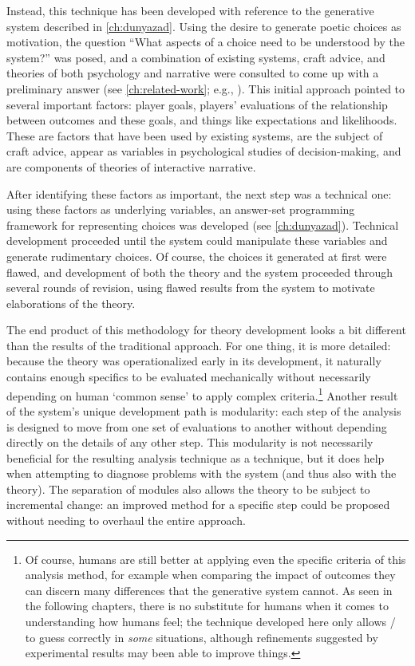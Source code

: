 Instead, this technique has been developed with reference to the generative system described in \cref{ch:dunyazad}.
%
Using the desire to generate poetic choices as motivation, the question ``What aspects of a choice need to be understood by the system?'' was posed, and a combination of existing systems, craft advice, and theories of both psychology and narrative were consulted to come up with a preliminary answer (see \cref{ch:related-work}; e.g., \citep{Mott2006,ChoiceOfGamesChoiceRules,Shepperd2002,WardripFruin2009}).
%
This initial approach pointed to several important factors: player goals, players' evaluations of the relationship between outcomes and these goals, and things like expectations and likelihoods.
%
These are factors that have been used by existing systems, are the subject of craft advice, appear as variables in psychological studies of decision-making, and are components of theories of interactive narrative.


After identifying these factors as important, the next step was a technical one: using these factors as underlying variables, an answer-set programming framework for representing choices was developed (see \cref{ch:dunyazad}).
%
Technical development proceeded until the system could manipulate these variables and generate rudimentary choices.
%
Of course, the choices it generated at first were flawed, and development of both the theory and the system proceeded through several rounds of revision, using flawed results from the system to motivate elaborations of the theory.


The end product of this methodology for theory development looks a bit different than the results of the traditional approach.
%
For one thing, it is more detailed: because the theory was operationalized early in its development, it naturally contains enough specifics to be evaluated mechanically without necessarily depending on human `common sense' to apply complex criteria.\footnote{%
Of course, humans are still better at applying even the specific criteria of this analysis method, for example when comparing the impact of outcomes they can discern many differences that the generative system cannot.
%
As seen in the following chapters, there is no substitute for humans when it comes to understanding how humans feel; the technique developed here only allows \dunyazad/ to guess correctly in \emph{some} situations, although refinements suggested by experimental results may been able to improve things.
}
%
Another result of the system's unique development path is modularity: each step of the analysis is designed to move from one set of evaluations to another without depending directly on the details of any other step.
%
This modularity is not necessarily beneficial for the resulting analysis technique as a technique, but it does help when attempting to diagnose problems with the system (and thus also with the theory).
%
The separation of modules also allows the theory to be subject to incremental change: an improved method for a specific step could be proposed without needing to overhaul the entire approach.



